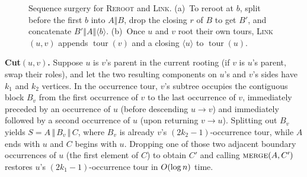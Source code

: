 \begin{figure}[htbp]
\caption{Sequence surgery for \textsc{Reroot} and \textsc{Link}. (a)~To reroot at $b$, split before the first $b$ into $A\mathbin{\Vert} B$, drop the closing $r$ of $B$ to get $B'$, and concatenate $B'\mathbin{\Vert} A\mathbin{\Vert}\langle b\rangle$. (b)~Once $u$ and $v$ root their own tours, \textsc{Link}$(u,v)$ appends $\operatorname{tour}(v)$ and a closing $\langle u\rangle$ to $\operatorname{tour}(u)$.}
\label{ch21:fig-reroot-link}
\end{figure}

\textbf{Cut$(u,v)$.} Suppose $u$ is $v$'s parent in the current rooting (if $v$ is $u$'s
parent, swap their roles), and let the two resulting components on $u$'s and $v$'s sides have $k_1$ and $k_2$ vertices. In the occurrence tour, $v$'s subtree occupies the contiguous
block $B_v$ from the first occurrence of $v$ to the last occurrence of $v$, immediately
preceded by an occurrence of $u$ (before descending $u\!\to\!v$) and immediately followed
by a second occurrence of $u$ (upon returning $v\!\to\!u$). Splitting out $B_v$ yields
$S = A\,\Vert\,B_v\,\Vert\,C$, where $B_v$ is already $v$'s $(2k_2-1)$-occurrence
tour, while $A$ ends with $u$ and $C$ begins with $u$. Dropping one of those two adjacent
boundary occurrences of $u$ (the first element of $C$) to obtain $C'$ and calling $\textsc{merge}(A,C')$
restores $u$'s $(2k_1-1)$-occurrence tour in $O(\log n)$ time.

\begin{algorithm}[H]
\caption{Euler tour tree operations (over an implicit balanced BST)}
\label{ch21:alg-ett}
\DontPrintSemicolon
{}
\end{algorithm}

